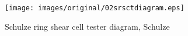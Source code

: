 \begin{figure}[!htb] 
\centering 
\texttt{[image: images/original/02srsctdiagram.eps]} 
\caption[Schulze ring shear cell tester diagram]{Schulze ring shear cell tester diagram,
Schulze \cite{RefWorks:118}}
\label{fig:02srsctdiagram} 
\end{figure}


